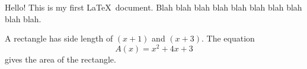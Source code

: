 \documentclass[11pt]{article}
\begin{document}
    Hello! This is my first \LaTeX\ document. Blah blah blah blah blah blah blah blah blah blah. 

    A rectangle has side length of $(x + 1)$ and $(x + 3)$. The equation $${A(x) = x^2 + 4x + 3}$$ gives the area of the rectangle.
\end{document}
